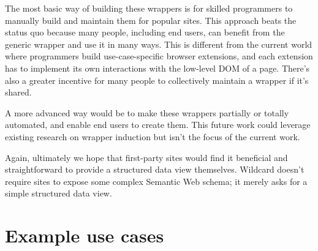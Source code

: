 \documentclass[english,submission]{programming}
\begin{document}
The most basic way of building these wrappers is for skilled programmers
to manually build and maintain them for popular sites. This approach
beats the status quo because many people, including end users, can
benefit from the generic wrapper and use it in many ways. This is
different from the current world where programmers build
use-case-specific browser extensions, and each extension has to
implement its own interactions with the low-level DOM of a page. There's
also a greater incentive for many people to collectively maintain a
wrapper if it's shared.

A more advanced way would be to make these wrappers partially or totally
automated, and enable end users to create them. This future work could
leverage existing research on wrapper induction but isn't the focus of
the current work.

Again, ultimately we hope that first-party sites would find it
beneficial and straightforward to provide a structured data view
themselves. Wildcard doesn't require sites to expose some complex
Semantic Web schema; it merely asks for a simple structured data view.

\hypertarget{example-use-cases}{%
\section{Example use cases}\label{example-use-cases}}

\acks
\printbibliography
\end{document}
